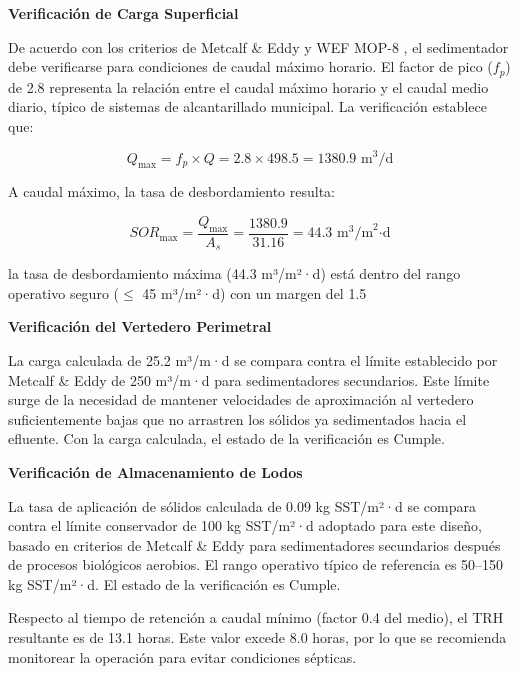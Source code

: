 \documentclass[12pt,a4paper]{article}
\begin{document}
\textbf{Verificación de Carga Superficial}

De acuerdo con los criterios de Metcalf \& Eddy \cite{metcalf2014} y WEF MOP-8 \cite{wef_mop8_2010}, el sedimentador debe verificarse para condiciones de caudal máximo horario. El factor de pico ($f_p$) de 2.8 representa la relación entre el caudal máximo horario y el caudal medio diario, típico de sistemas de alcantarillado municipal. La verificación establece que:

\begin{equation}
Q_{\max} = f_p \times Q = 2.8 \times 498.5 = 1380.9 \text{ m}^3\text{/d}
\end{equation}

A caudal máximo, la tasa de desbordamiento resulta:

\begin{equation}
SOR_{\max} = \frac{Q_{\max}}{A_s} = \frac{1380.9}{31.16} = 44.3 \text{ m}^3\text{/m}^2\text{·d}
\end{equation}

la tasa de desbordamiento máxima (44.3 m³/m²·d) está dentro del rango operativo seguro ($\leq$ 45 m³/m²·d) con un margen del 1.5%

\textbf{Verificación del Vertedero Perimetral}

La carga calculada de 25.2 m³/m·d se compara contra el límite establecido por Metcalf & Eddy de 250 m³/m·d para sedimentadores secundarios. Este límite surge de la necesidad de mantener velocidades de aproximación al vertedero suficientemente bajas que no arrastren los sólidos ya sedimentados hacia el efluente. Con la carga calculada, el estado de la verificación es Cumple.

\textbf{Verificación de Almacenamiento de Lodos}

La tasa de aplicación de sólidos calculada de 0.09 kg SST/m²·d se compara contra el límite conservador de 100 kg SST/m²·d adoptado para este diseño, basado en criterios de Metcalf & Eddy para sedimentadores secundarios después de procesos biológicos aerobios. El rango operativo típico de referencia es 50--150 kg SST/m²·d. El estado de la verificación es Cumple.

Respecto al tiempo de retención a caudal mínimo (factor 0.4 del medio), el TRH resultante es de 13.1 horas. Este valor excede 8.0 horas, por lo que se recomienda monitorear la operación para evitar condiciones sépticas.
\end{document}
